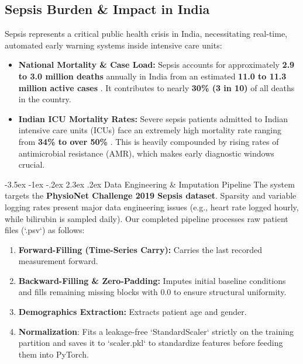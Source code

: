 \documentclass[11pt, a4paper]{article}
\makeatletter
\renewcommand\section{\@startsection {section}{1}{\z@}%
                                   {-3.5ex \@plus -1ex \@minus -.2ex}%
                                   {2.3ex \@plus.2ex}%
                                   {\normalfont\large\bfseries\color{amritaMaroon}}}
\makeatother
\begin{document}
\subsection{Sepsis Burden \& Impact in India}
Sepsis represents a critical public health crisis in India, necessitating real-time, automated early warning systems inside intensive care units:
\begin{itemize}
    \item \textbf{National Mortality \& Case Load:} Sepsis accounts for approximately \textbf{2.9 to 3.0 million deaths} annually in India from an estimated \textbf{11.0 to 11.3 million active cases} \cite{kalakoti2025fedxai}. It contributes to nearly \textbf{30\% (3 in 10)} of all deaths in the country.
    \item \textbf{Indian ICU Mortality Rates:} Severe sepsis patients admitted to Indian intensive care units (ICUs) face an extremely high mortality rate ranging from \textbf{34\% to over 50\%} \cite{dusing2025sepsis}. This is heavily compounded by rising rates of antimicrobial resistance (AMR), which makes early diagnostic windows crucial.
\end{itemize}


\section{Data Engineering \& Imputation Pipeline}
The system targets the \textbf{PhysioNet Challenge 2019 Sepsis dataset}. Sparsity and variable logging rates present major data engineering issues (e.g., heart rate logged hourly, while bilirubin is sampled daily).
Our completed pipeline processes raw patient files (`.psv`) as follows:
\begin{enumerate}
    \item \textbf{Forward-Filling (Time-Series Carry):} Carries the last recorded measurement forward.
    \item \textbf{Backward-Filling \& Zero-Padding:} Imputes initial baseline conditions and fills remaining missing blocks with $0.0$ to ensure structural uniformity.
    \item \textbf{Demographics Extraction:} Extracts patient age and gender.
    \item \textbf{Normalization}: Fits a leakage-free `StandardScaler` strictly on the training partition and saves it to `scaler.pkl` to standardize features before feeding them into PyTorch.
\end{enumerate}
\end{document}
